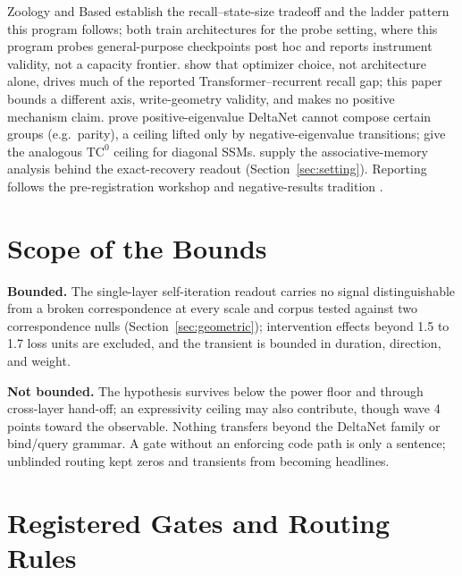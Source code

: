 \documentclass{article} %
\begin{document}
Zoology \citep{arora2023zoology} and Based \citep{arora2024simple}
establish the recall--state-size tradeoff and the ladder pattern this
program follows; both train architectures for the probe setting, where
this program probes general-purpose checkpoints post hoc and reports
instrument validity, not a capacity frontier.
\citet{okpekpe2025revisiting} show that optimizer choice, not architecture
alone, drives much of the reported Transformer--recurrent recall gap; this
paper bounds a different axis, write-geometry validity, and makes no
positive mechanism claim. \citet{grazzi2024unlocking} prove
positive-eigenvalue DeltaNet cannot compose certain groups (e.g.\ parity),
a ceiling lifted only by negative-eigenvalue transitions;
\citet{merrill2024illusion} give the analogous $\mathrm{TC}^0$ ceiling for
diagonal SSMs.
\citet{nichani2024understanding} supply the associative-memory analysis
behind the exact-recovery readout (Section~\ref{sec:setting}). Reporting
follows the pre-registration workshop \citep{bertinetto2021preface} and
negative-results tradition \citep{forde2020icbinb}.

\section{Scope of the Bounds}
\label{sec:scope}

\textbf{Bounded.} The single-layer self-iteration readout carries no
signal distinguishable from a broken correspondence at every scale and
corpus tested against two correspondence nulls
(Section~\ref{sec:geometric}); %
intervention effects beyond 1.5 to 1.7 loss units are excluded,
and the transient is bounded in duration, direction, and weight.

\textbf{Not bounded.} The hypothesis survives below the power floor and
through cross-layer hand-off; an expressivity ceiling
\citep{grazzi2024unlocking} may also contribute, though wave 4 points
toward the observable. %
Nothing transfers beyond the DeltaNet family or bind/query grammar. A gate
without an enforcing code path is only a sentence; unblinded routing kept
zeros and transients from becoming headlines. %





\appendix

\section{Registered Gates and Routing Rules}
\label{app:gates}
\end{document}
